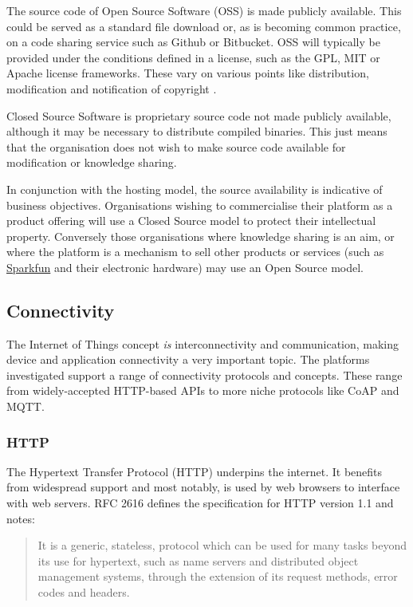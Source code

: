       The source code of Open Source Software (OSS) is made publicly available. This could be served as a standard file download or, as is becoming common practice, on a code sharing service such as Github or Bitbucket. OSS will typically be provided under the conditions defined in a license, such as the GPL, MIT or Apache license frameworks. These vary on various points like distribution, modification and notification of copyright \citep{license:2015}.

      Closed Source Software is proprietary source code not made publicly available, although it may be necessary to distribute compiled binaries. This just means that the organisation does not wish to make source code available for modification or knowledge sharing. 

      In conjunction with the hosting model, the source availability is indicative of business objectives. Organisations wishing to commercialise their platform as a product offering will use a Closed Source model to protect their intellectual property. Conversely those organisations where knowledge sharing is an aim, or where the platform is a mechanism to sell other products or services (such as \href{https://data.sparkfun.com/}{Sparkfun} and their electronic hardware) may use an Open Source model.

    \subsection{Connectivity}
      The Internet of Things concept \emph{is} interconnectivity and communication, making device and application connectivity a very important topic. The platforms investigated support a range of connectivity protocols and concepts. These range from widely-accepted HTTP-based APIs to more niche protocols like CoAP and MQTT.

      \subsubsection{HTTP}
        The Hypertext Transfer Protocol (HTTP) underpins the internet. It benefits from widespread support and most notably, is used by web browsers to interface with web servers. RFC 2616 \citep{rfc2616} defines the specification for HTTP version 1.1 and notes:

          \begin{quote}It is a generic, stateless, protocol which can be used for many tasks beyond its use for hypertext, such as name servers and distributed object management systems, through the extension of its request methods, error codes and headers.\end{quote}

